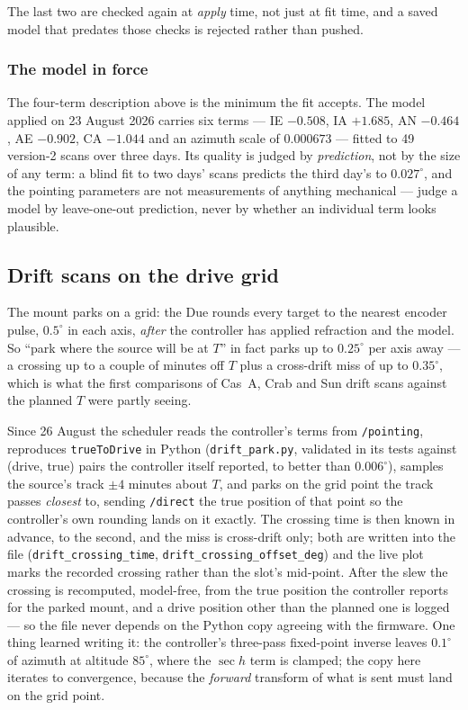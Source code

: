 \documentclass[11pt,a4paper]{article}
\begin{document}
The last two are checked again at \emph{apply} time, not just at fit time, and a saved model that predates those checks is rejected rather than pushed.

\subsubsection{The model in force}

The four-term description above is the minimum the fit accepts. The model applied on 23 August 2026 carries six terms --- IE $-0.508$, IA $+1.685$, AN $-0.464$, AE $-0.902$, CA $-1.044$ and an azimuth scale of $0.000673$ --- fitted to 49 version-2 scans over three days. Its quality is judged by \emph{prediction}, not by the size of any term: a blind fit to two days' scans predicts the third day's to $0.027^\circ$, and the pointing parameters are not measurements of anything mechanical --- judge a model by leave-one-out prediction, never by whether an individual term looks plausible.

\subsection{Drift scans on the drive grid}
\label{sec:driftgrid}

The mount parks on a grid: the Due rounds every target to the nearest encoder pulse, $0.5^\circ$ in each axis, \emph{after} the controller has applied refraction and the model. So ``park where the source will be at $T$'' in fact parks up to $0.25^\circ$ per axis away --- a crossing up to a couple of minutes off $T$ plus a cross-drift miss of up to $0.35^\circ$, which is what the first comparisons of Cas~A, Crab and Sun drift scans against the planned $T$ were partly seeing.

Since 26 August the scheduler reads the controller's terms from \texttt{/pointing}, reproduces \texttt{trueToDrive} in Python (\texttt{drift\_park.py}, validated in its tests against (drive, true) pairs the controller itself reported, to better than $0.006^\circ$), samples the source's track $\pm 4$ minutes about $T$, and parks on the grid point the track passes \emph{closest} to, sending \texttt{/direct} the true position of that point so the controller's own rounding lands on it exactly. The crossing time is then known in advance, to the second, and the miss is cross-drift only; both are written into the file (\texttt{drift\_crossing\_time}, \texttt{drift\_crossing\_offset\_deg}) and the live plot marks the recorded crossing rather than the slot's mid-point. After the slew the crossing is recomputed, model-free, from the true position the controller reports for the parked mount, and a drive position other than the planned one is logged --- so the file never depends on the Python copy agreeing with the firmware. One thing learned writing it: the controller's three-pass fixed-point inverse leaves $0.1^\circ$ of azimuth at altitude $85^\circ$, where the $\sec h$ term is clamped; the copy here iterates to convergence, because the \emph{forward} transform of what is sent must land on the grid point.
\end{document}
